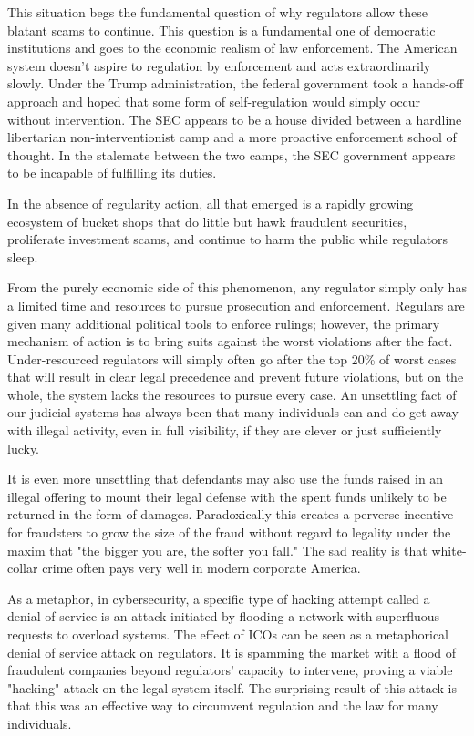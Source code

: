 This situation begs the fundamental question of why regulators allow these
blatant scams to continue. This question is a fundamental one of democratic
institutions and goes to the economic realism of law enforcement. The American
system doesn't aspire to regulation by enforcement and acts extraordinarily
slowly. Under the Trump administration, the federal government took a hands-off
approach and hoped that some form of self-regulation would simply occur without
intervention. The SEC appears to be a house divided between a hardline
libertarian non-interventionist camp and a more proactive enforcement school of
thought. In the stalemate between the two camps, the SEC government appears to
be incapable of fulfilling its duties.

In the absence of regularity action, all that emerged is a rapidly growing
ecosystem of bucket shops that do little but hawk fraudulent securities,
proliferate investment scams, and continue to harm the public while regulators
sleep. \cite{zetzsche_ico_2017,cristina_cuervo_regulation_2020}


From the purely economic side of this phenomenon, any regulator simply only has
a limited time and resources to pursue prosecution and enforcement. Regulars are
given many additional political tools to enforce rulings; however, the primary
mechanism of action is to bring suits against the worst violations after the
fact. Under-resourced regulators will simply often go after the top 20\% of worst
cases that will result in clear legal precedence and prevent future violations,
but on the whole, the system lacks the resources to pursue every case. An
unsettling fact of our judicial systems has always been that many individuals
can and do get away with illegal activity, even in full visibility, if they are
clever or just sufficiently lucky.

It is even more unsettling that defendants may also use the funds raised in an
illegal offering to mount their legal defense with the spent funds unlikely to
be returned in the form of damages. \cite{levi_regulating_2013} Paradoxically this
creates a perverse incentive for fraudsters to grow the size of the fraud
without regard to legality under the maxim that "the bigger you are, the softer
you fall." The sad reality is that white-collar crime often pays very well in
modern corporate America.

As a metaphor, in cybersecurity, a specific type of hacking attempt called a
denial of service is an attack initiated by flooding a network with superfluous
requests to overload systems. The effect of ICOs can be seen as a metaphorical
denial of service attack on regulators. It is spamming the market with a flood
of fraudulent companies beyond regulators' capacity to intervene, proving a
viable "hacking" attack on the legal system itself. The surprising result of
this attack is that this was an effective way to circumvent regulation and the
law for many individuals.

